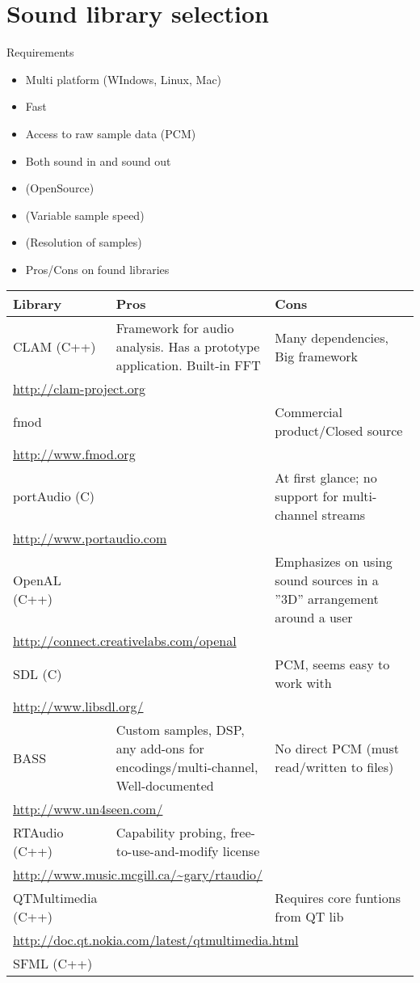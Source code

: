 \chapter{Sound library selection}\label{chap:lib}
Requirements
\begin{itemize}
\item Multi platform (WIndows, Linux, Mac)
\item Fast
\item Access to raw sample data (PCM)
\item Both sound in and sound out
\item(OpenSource)
\item(Variable sample speed)
\item(Resolution of samples)
\item Pros/Cons on found libraries
\end{itemize}

\begin{table}
\centering
\begin{tabularx}{\textwidth}{lXX}
Library & Pros & Cons\\
\midrule
CLAM (C++) & Framework for audio analysis. Has a prototype application. Built-in FFT & Many dependencies, Big framework\\
\multicolumn{3}{l}{\url{http://clam-project.org}}\\
\midrule
fmod & & Commercial product/Closed source\\
\multicolumn{3}{l}{\url{http://www.fmod.org}}\\
\midrule
portAudio (C) & & At first glance; no support for multi-channel streams\\
\multicolumn{3}{l}{\url{http://www.portaudio.com}}\\
\midrule
OpenAL (C++)& & Emphasizes on using sound sources in a ''3D'' arrangement around a user\\
\multicolumn{3}{l}{\url{http://connect.creativelabs.com/openal}}\\
\midrule
SDL (C) & & PCM, seems easy to work with \\
\multicolumn{3}{l}{\url{http://www.libsdl.org/}}\\
\midrule
BASS & Custom samples, DSP,  any add-ons for encodings/multi-channel, Well-documented & No direct PCM (must read/written to files)\\
\multicolumn{3}{l}{\url{http://www.un4seen.com/}}\\
\midrule
RTAudio (C++) & Capability probing, free-to-use-and-modify license & \\
\multicolumn{3}{l}{\url{http://www.music.mcgill.ca/~gary/rtaudio/}}\\
\midrule
QTMultimedia (C++) & & Requires core funtions from QT lib\\
\multicolumn{3}{l}{\url{http://doc.qt.nokia.com/latest/qtmultimedia.html}}\\
\midrule
SFML (C++) & & 
\end{tabularx}
\end{table}